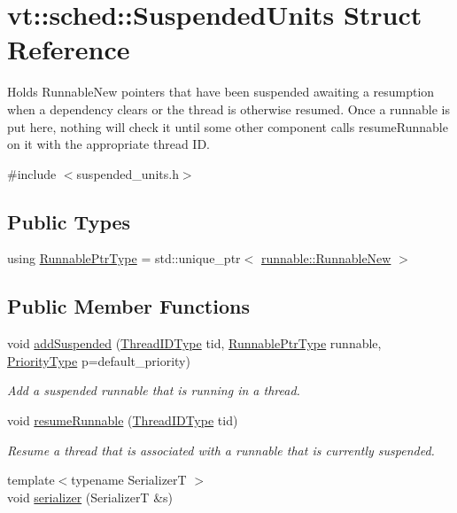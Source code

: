 \hypertarget{structvt_1_1sched_1_1_suspended_units}{}\section{vt\+:\+:sched\+:\+:Suspended\+Units Struct Reference}
\label{structvt_1_1sched_1_1_suspended_units}


Holds {\ttfamily Runnable\+New} pointers that have been suspended awaiting a resumption when a dependency clears or the thread is otherwise resumed. Once a runnable is put here, nothing will check it until some other component calls {\ttfamily resume\+Runnable} on it with the appropriate thread ID.  




{\ttfamily \#include $<$suspended\+\_\+units.\+h$>$}

\subsection*{Public Types}
\begin{DoxyCompactItemize}
\item 
using \hyperlink{structvt_1_1sched_1_1_suspended_units_a48612d5997d8d3869ca8f2e1d061fd5f}{Runnable\+Ptr\+Type} = std\+::unique\+\_\+ptr$<$ \hyperlink{structvt_1_1runnable_1_1_runnable_new}{runnable\+::\+Runnable\+New} $>$
\end{DoxyCompactItemize}
\subsection*{Public Member Functions}
\begin{DoxyCompactItemize}
\item 
void \hyperlink{structvt_1_1sched_1_1_suspended_units_af98ef20b8bf4e914b673a50c3d3a83ba}{add\+Suspended} (\hyperlink{namespacevt_a9b887d814dd25ff495a0c8270304ac02}{Thread\+I\+D\+Type} tid, \hyperlink{structvt_1_1sched_1_1_suspended_units_a48612d5997d8d3869ca8f2e1d061fd5f}{Runnable\+Ptr\+Type} runnable, \hyperlink{namespacevt_a86bff9f556eb761b27fc8600d006ac04}{Priority\+Type} p=default\+\_\+priority)
\begin{DoxyCompactList}\small\item\em Add a suspended runnable that is running in a thread. \end{DoxyCompactList}\item 
void \hyperlink{structvt_1_1sched_1_1_suspended_units_a9c6e5accda32f30bf5541fe1f6be7d05}{resume\+Runnable} (\hyperlink{namespacevt_a9b887d814dd25ff495a0c8270304ac02}{Thread\+I\+D\+Type} tid)
\begin{DoxyCompactList}\small\item\em Resume a thread that is associated with a runnable that is currently suspended. \end{DoxyCompactList}\item 
{\footnotesize template$<$typename SerializerT $>$ }\\void \hyperlink{structvt_1_1sched_1_1_suspended_units_a849db2cdb3218a3c0221b21b6c0defad}{serializer} (SerializerT \&s)
\end{DoxyCompactItemize}
